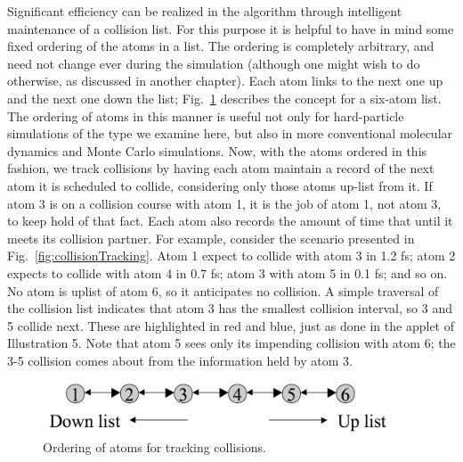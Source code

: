 \documentclass[]{article}
\begin{document}
Significant efficiency can be realized in the algorithm through intelligent
maintenance of a collision list. For this purpose it is helpful to have
in mind some fixed ordering of the atoms in a list. The ordering is
completely arbitrary, and need not change ever during the simulation
(although one might wish to do otherwise, as discussed in another
chapter). Each atom links to the next one up and the next one down the
list; Fig.~\ref{fig:ordering} describes the concept for a six-atom list. The
ordering of atoms in this manner is useful not only for hard-particle
simulations of the type we examine here, but also in more conventional
molecular dynamics and Monte Carlo simulations. Now, with the atoms
ordered in this fashion, we track collisions by having each atom
maintain a record of the next atom it is scheduled to collide,
considering only those atoms up-list from it. If atom 3 is on a
collision course with atom 1, it is the job of atom 1, not atom 3, to
keep hold of that fact. Each atom also records the amount of time that
until it meets its collision partner. For example, consider the scenario
presented in Fig.~\ref{fig:collisionTracking}. Atom 1 expect to collide with atom 3 in 1.2
fs; atom 2 expects to collide with atom 4 in 0.7 fs; atom 3 with atom 5
in 0.1 fs; and so on. No atom is uplist of atom 6, so it anticipates no
collision. A simple traversal of the collision list indicates that atom
3 has the smallest collision interval, so 3 and 5 collide next. These
are highlighted in red and blue, just as done in the applet of
Illustration 5. Note that atom 5 sees only its impending collision with
atom 6; the 3-5 collision comes about from the information held by atom
3.

\begin{figure}
  \centering
  \includegraphics[width=\textwidth]{HSMD_figures/image040}
  \caption{\label{fig:ordering}Ordering of atoms for tracking collisions.}
\end{figure}
\end{document}
